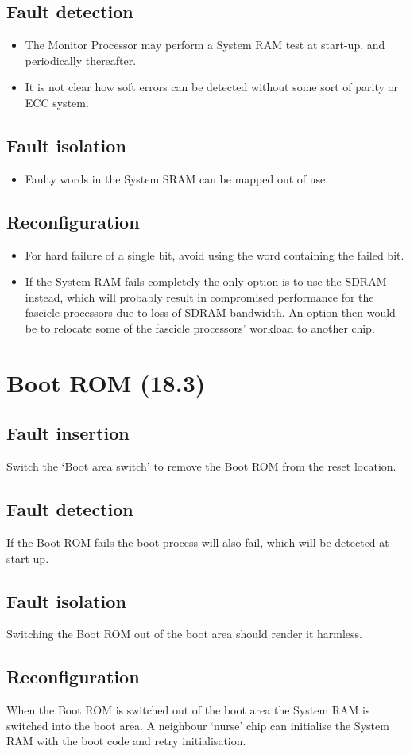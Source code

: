 \documentclass[oneside, a4paper, 11pt]{memoir}
\newenvironment{itmz}{
	\begin{itemize}
		\setlength{\itemsep}{0pt}
		\setlength{\parskip}{0pt}
	}{\end{itemize}}
\begin{document}
\subsection*{Fault detection}
\begin{itmz}
\item The Monitor Processor may perform a System RAM test at start-up, and periodically thereafter.
\item It is not clear how soft errors can be detected without some sort of parity or ECC system.
\end{itmz}
\subsection*{Fault isolation}
\begin{itmz}
\item Faulty words in the System SRAM can be mapped out of use.
\end{itmz}
\subsection*{Reconfiguration}
\begin{itmz}
\item For hard failure of a single bit, avoid using the word containing the failed bit.
\item If the System RAM fails completely the only option is to use the SDRAM instead, which will
probably result in compromised performance for the fascicle processors due to loss of SDRAM
bandwidth. An option then would be to relocate some of the fascicle processors' workload to
another chip.
\end{itmz}

\section{Boot ROM (18.3)}
\subsection*{Fault insertion}
Switch the `Boot area switch' to remove the Boot ROM from the reset location.
\subsection*{Fault detection}
If the Boot ROM fails the boot process will also fail, which will be detected at start-up.
\subsection*{Fault isolation}
Switching the Boot ROM out of the boot area should render it harmless.
\subsection*{Reconfiguration}
When the Boot ROM is switched out of the boot area the System RAM is switched into the boot
area. A neighbour `nurse' chip can initialise the System RAM with the boot code and retry
initialisation.
\end{document}
